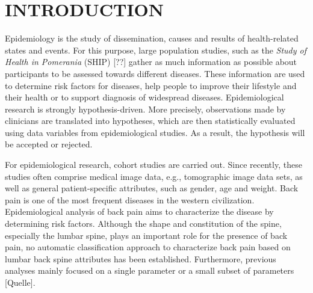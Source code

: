 \documentclass[a4paper,twoside]{style/article}
\begin{document}
\onecolumn \maketitle \normalsize \vfill

\section{\uppercase{Introduction}}
\label{sec:Introduction}
Epidemiology is the study of dissemination, causes and results of health-related states and events.
For this purpose, large population studies, such as the \emph{Study of Health in Pomerania} (SHIP) [??] gather as much information as possible about participants to be assessed towards different diseases.
These information are used to determine risk factors for diseases, help people to improve their lifestyle and their health or to support diagnosis of widespread diseases.
Epidemiological research is strongly hypothesis-driven.
More precisely, observations made by clinicians are translated into hypotheses, which are then statistically evaluated using data variables from epidemiological studies.
As a result, the hypothesis will be accepted or rejected.

For epidemiological research, cohort studies are carried out.
Since recently, these studies often comprise medical image data, e.g., tomographic image data sets, as well as general patient-specific attributes, such as gender, age and weight.
Back pain is one of the most frequent diseases in the western civilization. 
Epidemiological analysis of back pain aims to characterize the disease by determining risk factors.
Although the shape and constitution of the spine, especially the lumbar spine, plays an important role for the presence of back pain, no automatic classification approach to characterize back pain based on lumbar back spine attributes has been established.
Furthermore, previous analyses mainly focused on a single parameter or a small subset of parameters [Quelle].
\end{document}
